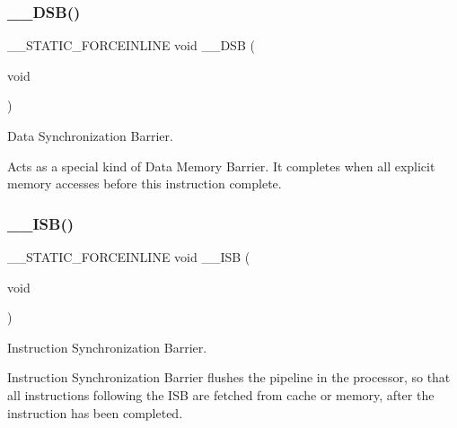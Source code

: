 \subsubsection{\texorpdfstring{\+\_\+\+\_\+\+D\+S\+B()}{\_\_DSB()}}
{\footnotesize\ttfamily \+\_\+\+\_\+\+S\+T\+A\+T\+I\+C\+\_\+\+F\+O\+R\+C\+E\+I\+N\+L\+I\+NE void \+\_\+\+\_\+\+D\+SB (\begin{DoxyParamCaption}\item[{void}]{ }\end{DoxyParamCaption})}



Data Synchronization Barrier. 

Acts as a special kind of Data Memory Barrier. It completes when all explicit memory accesses before this instruction complete. \mbox{\label{group___c_m_s_i_s___core___instruction_interface_gae26c2b3961e702aeabc24d4984ebd369}} 
\subsubsection{\texorpdfstring{\+\_\+\+\_\+\+I\+S\+B()}{\_\_ISB()}}
{\footnotesize\ttfamily \+\_\+\+\_\+\+S\+T\+A\+T\+I\+C\+\_\+\+F\+O\+R\+C\+E\+I\+N\+L\+I\+NE void \+\_\+\+\_\+\+I\+SB (\begin{DoxyParamCaption}\item[{void}]{ }\end{DoxyParamCaption})}



Instruction Synchronization Barrier. 

Instruction Synchronization Barrier flushes the pipeline in the processor, so that all instructions following the I\+SB are fetched from cache or memory, after the instruction has been completed. \mbox{\label{group___c_m_s_i_s___core___instruction_interface_gaf944a7b7d8fd70164cca27669316bcf7}} 

